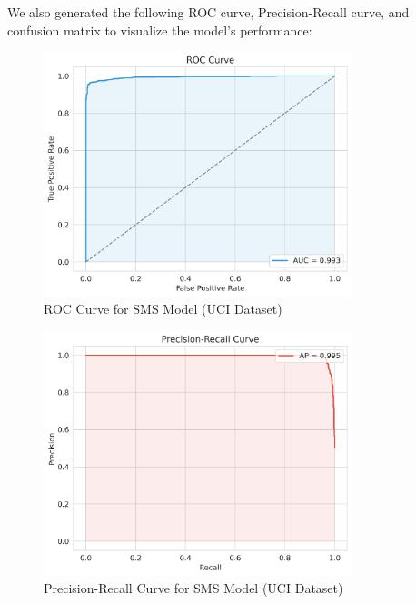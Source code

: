\documentclass{article}
\begin{document}
\noindent
We also generated the following ROC curve, Precision-Recall curve, and confusion matrix to visualize the model's performance:

\begin{figure}[htbp]
    \centering
    \includegraphics[width=0.8\textwidth]{../analysis/sms/randomforest/uci/roc_curve.png}
    \caption{ROC Curve for SMS Model (UCI Dataset)}
    \label{fig:roc_curve_3}
\end{figure}

\begin{figure}[htbp]
    \centering
    \includegraphics[width=0.8\textwidth]{../analysis/sms/randomforest/uci/precision_recall_curve.png}
    \caption{Precision-Recall Curve for SMS Model (UCI Dataset)}
    \label{fig:precision_recall_curve_3}
\end{figure}
\end{document}
